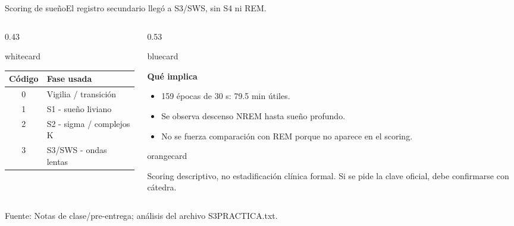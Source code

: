 \documentclass[aspectratio=169,10pt]{beamer}
\newcommand{\source}[1]{\vfill {\tiny\color{Muted}Fuente: #1}}
\newenvironment{card}[2][whitecard]{%
  \begin{beamercolorbox}[wd=#2,sep=0.20cm,rounded=true]{#1}\RaggedRight
}{\end{beamercolorbox}}
\begin{document}
\begin{frame}{Scoring de sueño}{El registro secundario llegó a S3/SWS, sin S4 ni REM.}
\begin{columns}[T,totalwidth=\textwidth]
\begin{column}{0.43\textwidth}
\begin{card}[whitecard]{\linewidth}
\begin{tabularx}{\linewidth}{cl}
\toprule
Código & Fase usada\\
\midrule
0 & Vigilia / transición\\
1 & S1 - sueño liviano\\
2 & S2 - sigma / complejos K\\
3 & S3/SWS - ondas lentas\\
\bottomrule
\end{tabularx}
\end{card}
\end{column}
\begin{column}{0.53\textwidth}
\begin{card}[bluecard]{\linewidth}
\textbf{Qué implica}\par
\begin{itemize}
\item 159 épocas de 30 s: 79.5 min útiles.
\item Se observa descenso NREM hasta sueño profundo.
\item No se fuerza comparación con REM porque no aparece en el scoring.
\end{itemize}
\end{card}
\vspace{0.25cm}
\begin{card}[orangecard]{\linewidth}
Scoring descriptivo, no estadificación clínica formal. Si se pide la clave oficial, debe confirmarse con cátedra.
\end{card}
\end{column}
\end{columns}
\source{Notas de clase/pre-entrega; análisis del archivo S3PRACTICA.txt.}
\end{frame}
\end{document}
